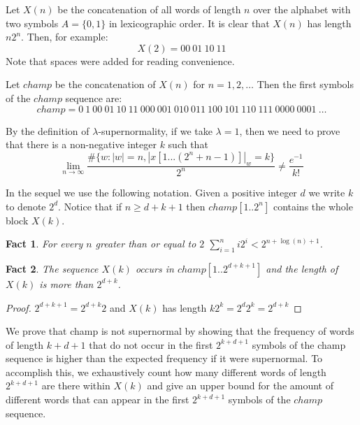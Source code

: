 \documentclass[11pt,a4paper]{tesis}
\newtheorem{fact}{Fact}[]
\begin{document}
Let $X(n)$ be the concatenation of all words of length $n$ over the alphabet with two symbols $A=\{0,1\}$ in lexicographic order.  It is clear that $X(n)$ has length $n2^n$. Then, for example:
$$X(2) = 00 \: 01 \: 10 \: 11$$
Note that spaces were added for reading convenience.

Let $champ$
 be the concatenation of $X(n)$ for $n = 1,2,\dots$
 Then the first symbols of the $champ$
sequence are:
$$champ = 0 \: 1 \: 00 \: 01 \: 10 \: 11 \: 000 \: 001 \: 010 \: 011 \: 100 \: 101 \: 110 \: 111 \: 0000 \: 0001 \: \dots$$

By the definition of $\lambda$-supernormality, if we take $\lambda = 1$, then we need to prove that there is a non-negative integer $k$ such that
$$\lim_{n\to\infty} \frac{\#\{w: |w| = n  , |x[1...(2^n+n-1)]|_w = k\}}{2^n} \neq \frac{e^{-1}}{k!}$$

\bigskip

In the sequel we use the following notation. Given  a positive integer $d$ we write $k$ to denote $2^d$.
Notice that if  $n \geq d + k + 1$ then $champ[1.. 2^n]$ contains the whole block $X(k)$.%


\begin{fact}
For every $n$ greater than or equal to $2$  $\sum_{i=1}^n i2^i < 2^{n + \log(n) + 1}$.
\end{fact}

\begin{fact} \label{p2}
The sequence $X(k)$ occurs in $champ[1.. 2^{d+k+1}]$ and  the length of $X(k)$ is more than $2^{d+k}$.
\end{fact}
\begin{proof}
  $2^{d+k+1} = 2^{d+k}2$ and $X(k)$ has length $k2^k = 2^d2^k = 2^{d+k}$ 
\end{proof}

We prove that champ is not supernormal by showing that the frequency of words
 of length $k+d+1$ that do not occur in the first $2^{k+d+1}$ symbols of the champ
 sequence is higher than the expected frequency if it were supernormal.
To accomplish this, we exhaustively count how many different words of length $2^{k+d+1}$ 
are there within $X(k)$ and give an upper bound for the amount of different words that can 
appear in the first $2^{k+d+1}$ symbols of the $champ$ sequence.
\end{document}
